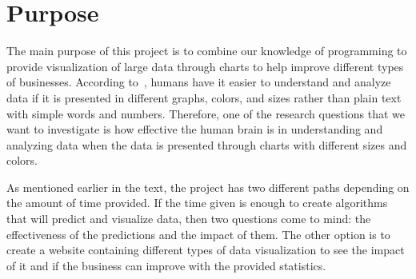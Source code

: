 \section{Purpose}
The main purpose of this project is to combine our knowledge of programming to provide visualization of large data through charts to help improve different types of businesses. According to~\cite{pyvis}, humans have it easier to understand and analyze data if it is presented in different graphs, colors, and sizes rather than plain text with simple words and numbers. Therefore, one of the research questions that we want to investigate is how effective the human brain is in understanding and analyzing data when the data is presented through charts with different sizes and colors. 

As mentioned earlier in the text, the project has two different paths depending on the amount of time provided. If the time given is enough to create algorithms that will predict and visualize data, then two questions come to mind: the effectiveness of the predictions and the impact of them. The other option is to create a website containing different types of data visualization to see the impact of it and if the business can improve with the provided statistics.  


